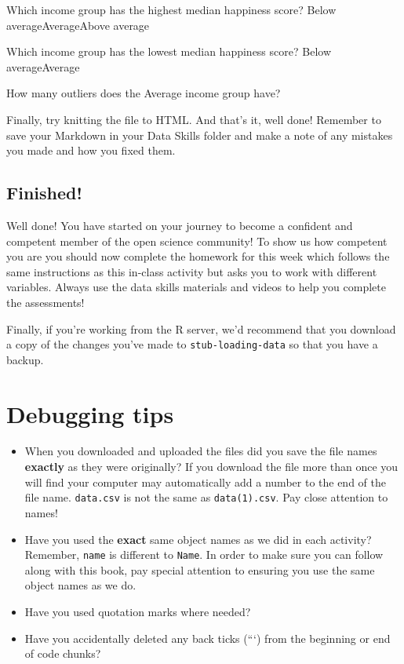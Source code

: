 \documentclass[
  oneside]{book}
\providecommand{\tightlist}{%
  \setlength{\itemsep}{0pt}\setlength{\parskip}{0pt}}
\begin{document}
Which income group has the highest median happiness score? Below averageAverageAbove average

Which income group has the lowest median happiness score? Below averageAverage

How many outliers does the Average income group have?

Finally, try knitting the file to HTML. And that's it, well done! Remember to save your Markdown in your Data Skills folder and make a note of any mistakes you made and how you fixed them.

\hypertarget{finished-1}{%
\subsection{Finished!}\label{finished-1}}

Well done! You have started on your journey to become a confident and competent member of the open science community! To show us how competent you are you should now complete the homework for this week which follows the same instructions as this in-class activity but asks you to work with different variables. Always use the data skills materials and videos to help you complete the assessments!

Finally, if you're working from the R server, we'd recommend that you download a copy of the changes you've made to \texttt{stub-loading-data} so that you have a backup.

\hypertarget{debugging-tips-1}{%
\section{Debugging tips}\label{debugging-tips-1}}

\begin{itemize}
\tightlist
\item
  When you downloaded and uploaded the files did you save the file names \textbf{exactly} as they were originally? If you download the file more than once you will find your computer may automatically add a number to the end of the file name. \texttt{data.csv} is not the same as \texttt{data(1).csv}. Pay close attention to names!
\item
  Have you used the \textbf{exact} same object names as we did in each activity? Remember, \texttt{name} is different to \texttt{Name}. In order to make sure you can follow along with this book, pay special attention to ensuring you use the same object names as we do.\\
\item
  Have you used quotation marks where needed?\\
\item
  Have you accidentally deleted any back ticks (```) from the beginning or end of code chunks?
\end{itemize}
\end{document}
